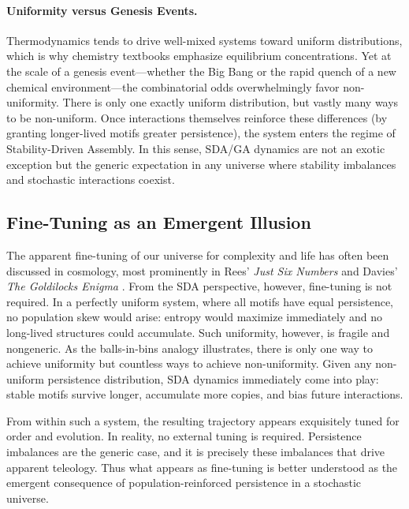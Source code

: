 \documentclass[life,article,submit,pdftex,moreauthors]{Definitions/mdpi}
\begin{document}
\paragraph{Uniformity versus Genesis Events.}  
Thermodynamics tends to drive well-mixed systems toward uniform distributions, which is why chemistry textbooks emphasize equilibrium concentrations. Yet at the scale of a genesis event—whether the Big Bang or the rapid quench of a new chemical environment—the combinatorial odds overwhelmingly favor non-uniformity. There is only one exactly uniform distribution, but vastly many ways to be non-uniform. Once interactions themselves reinforce these differences (by granting longer-lived motifs greater persistence), the system enters the regime of Stability-Driven Assembly. In this sense, SDA/GA dynamics are not an exotic exception but the generic expectation in any universe where stability imbalances and stochastic interactions coexist.


\subsection{Fine-Tuning as an Emergent Illusion}  

The apparent fine-tuning of our universe for complexity and life has often been discussed in cosmology, most prominently in Rees’ \textit{Just Six Numbers} \cite{rees2000six} and Davies’ \textit{The Goldilocks Enigma} \cite{davies2006goldilocks}.  
From the SDA perspective, however, fine-tuning is not required. In a perfectly uniform system, where all motifs have equal persistence, no population skew would arise: entropy would maximize immediately and no long-lived structures could accumulate.  
Such uniformity, however, is fragile and nongeneric.  
As the balls-in-bins analogy illustrates, there is only one way to achieve uniformity but countless ways to achieve non-uniformity.  
Given any non-uniform persistence distribution, SDA dynamics immediately come into play: stable motifs survive longer, accumulate more copies, and bias future interactions.  

From within such a system, the resulting trajectory appears exquisitely tuned for order and evolution.  
In reality, no external tuning is required.  
Persistence imbalances are the generic case, and it is precisely these imbalances that drive apparent teleology.  
Thus what appears as fine-tuning is better understood as the emergent consequence of population-reinforced persistence in a stochastic universe.  
\end{document}
